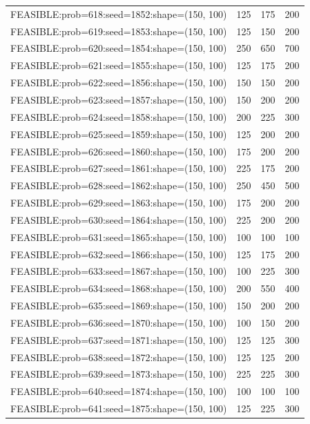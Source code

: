 \begin{longtable}{lccc}
FEASIBLE:prob=618:seed=1852:shape=(150, 100) &  125 &   175 &    200 \\
FEASIBLE:prob=619:seed=1853:shape=(150, 100) &  125 &   150 &    200 \\
FEASIBLE:prob=620:seed=1854:shape=(150, 100) &  250 &   650 &    700 \\
FEASIBLE:prob=621:seed=1855:shape=(150, 100) &  125 &   175 &    200 \\
FEASIBLE:prob=622:seed=1856:shape=(150, 100) &  150 &   150 &    200 \\
FEASIBLE:prob=623:seed=1857:shape=(150, 100) &  150 &   200 &    200 \\
FEASIBLE:prob=624:seed=1858:shape=(150, 100) &  200 &   225 &    300 \\
FEASIBLE:prob=625:seed=1859:shape=(150, 100) &  125 &   200 &    200 \\
FEASIBLE:prob=626:seed=1860:shape=(150, 100) &  175 &   200 &    200 \\
FEASIBLE:prob=627:seed=1861:shape=(150, 100) &  225 &   175 &    200 \\
FEASIBLE:prob=628:seed=1862:shape=(150, 100) &  250 &   450 &    500 \\
FEASIBLE:prob=629:seed=1863:shape=(150, 100) &  175 &   200 &    200 \\
FEASIBLE:prob=630:seed=1864:shape=(150, 100) &  225 &   200 &    200 \\
FEASIBLE:prob=631:seed=1865:shape=(150, 100) &  100 &   100 &    100 \\
FEASIBLE:prob=632:seed=1866:shape=(150, 100) &  125 &   175 &    200 \\
FEASIBLE:prob=633:seed=1867:shape=(150, 100) &  100 &   225 &    300 \\
FEASIBLE:prob=634:seed=1868:shape=(150, 100) &  200 &   550 &    400 \\
FEASIBLE:prob=635:seed=1869:shape=(150, 100) &  150 &   200 &    200 \\
FEASIBLE:prob=636:seed=1870:shape=(150, 100) &  100 &   150 &    200 \\
FEASIBLE:prob=637:seed=1871:shape=(150, 100) &  125 &   125 &    300 \\
FEASIBLE:prob=638:seed=1872:shape=(150, 100) &  125 &   125 &    200 \\
FEASIBLE:prob=639:seed=1873:shape=(150, 100) &  225 &   225 &    300 \\
FEASIBLE:prob=640:seed=1874:shape=(150, 100) &  100 &   100 &    100 \\
FEASIBLE:prob=641:seed=1875:shape=(150, 100) &  125 &   225 &    300 \\

\end{longtable}
